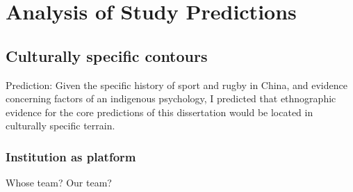 \section{Analysis of Study Predictions}


  \subsection{Culturally specific contours}


    Prediction: Given the specific history of sport and rugby in China, and evidence concerning factors of an indigenous psychology, I predicted that ethnographic evidence for the core predictions of this dissertation would be located in culturally specific terrain.


    \subsubsection{Institution as platform}

Whose team? Our team?







